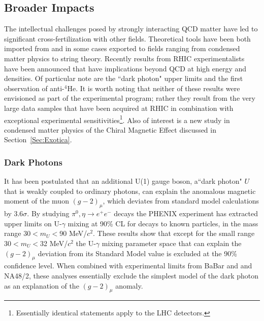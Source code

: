 \subsection{Broader Impacts}
\label{Sec:Cross}
 
 The intellectual challenges posed by strongly interacting QCD matter have led to significant cross-fertilization with other fields. Theoretical tools have been both imported from and in some cases exported to fields ranging from condensed matter physics to string theory. 
 Recently results from RHIC experimentalists have been announced that have implications beyond QCD at high energy and densities. Of particular note are the ``dark photon" upper limits and the first observation of anti-$^{4}$He. 
It is worth noting that neither of these results were envisioned as part of the experimental program; 
rather they result from the very large data samples that have been acquired at RHIC in combination with exceptional experimental sensitivities\footnote{Essentially identical statements apply to the LHC detectors.}.
Also of interest is a new study in condensed matter physics of the Chiral Magnetic Effect discussed in Section~\ref{Sec:Exotica}.

\subsubsection{Dark Photons}
It has been postulated that an additional U(1) gauge boson, a``dark photon" $U$ that is weakly coupled to ordinary photons, can explain the anomalous magnetic moment of the muon $(g-2)_\mu$, which deviates from  standard model calculations by 3.6$\sigma$. By studying  $\pi^0, \eta \rightarrow e^+e^-$ decays the PHENIX experiment has extracted upper limits on U-$\gamma$ mixing at 90\% CL for decays to known particles, in the mass range 30$<m_U<$90 MeV/$c^2$\cite{Adare:2014mgk}. These results show that except for the small range 30$<m_U<$32 MeV/$c^2$ the 
 U-$\gamma$ mixing parameter space that can explain the $(g-2)_\mu$ deviation from its Standard Model value is  excluded at the 90\% confidence level.
When combined with 
experimental limits from BaBar\cite{Lees:2014xha} and and NA48/2\cite{Adlarson:2014hka}, these analyses essentially
exclude the simplest model of the dark photon as an explanation of the
$(g-2)_\mu$ anomaly.



